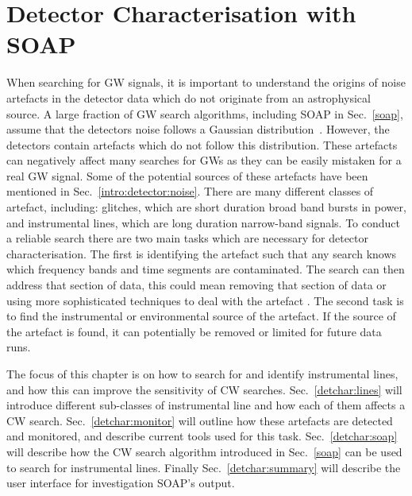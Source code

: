\chapter{\label{detchar}Detector Characterisation with SOAP}

When searching for \gls{GW} signals, it is important to understand the origins
of noise artefacts in the detector data which do not originate from an
astrophysical source.  A large fraction of \gls{GW} search algorithms,
including SOAP in Sec.~\ref{soap}, assume that the detectors noise follows a Gaussian
distribution~.  However, the detectors contain artefacts which do not follow
this distribution.  These artefacts can negatively affect many searches for
\glspl{GW} as they can be easily mistaken for a real \gls{GW} signal.  Some of
the potential sources of these artefacts have been mentioned in
Sec.~\ref{intro:detector:noise}.  There are many different classes of artefact,
including: glitches, which are short duration broad band bursts in
power, and
instrumental lines, which are long duration narrow-band signals.  To conduct a
reliable search there are two main tasks which are necessary for detector
characterisation.  The first is identifying the artefact such that any search
knows which frequency bands and time segments are contaminated.  The search can
then address that section of data, this could mean removing that section of
data or using more sophisticated techniques to deal with the artefact
\citep{pankow2018MitigationInstrumental}.  The second task is to find the
instrumental or environmental source of the artefact.  If the source of the artefact is found, it can
potentially be removed or limited for future data runs.

The focus of this chapter is on how to search for and identify instrumental lines, and how this can improve the sensitivity of \gls{CW} searches.
Sec.~\ref{detchar:lines} will introduce different sub-classes of instrumental line and how each of them affects a \gls{CW} search.
Sec.~\ref{detchar:monitor} will outline how these artefacts are detected and monitored, and describe current tools used for this task.
Sec.~\ref{detchar:soap} will describe how the \gls{CW} search algorithm
introduced in Sec.~\ref{soap} can be used to search for instrumental lines.
Finally Sec.~\ref{detchar:summary} will describe the user interface for investigation SOAP's output.



